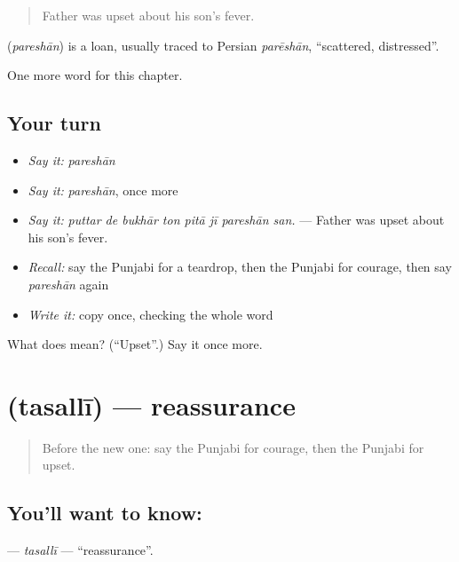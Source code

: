 \begin{quote}
Father was upset about his son's fever.
\end{quote}

\begin{cousinweb}
\textbf{} (\emph{pareshān}) is a loan, usually traced to Persian \emph{parēshān}, \textquotedblleft{}scattered, distressed\textquotedblright{}.
\end{cousinweb}

\begin{grammarlens}[title={What you've built}]
One more word for this chapter.
\end{grammarlens}

\subsection*{Your turn}
\begin{itemize}
\raggedright
  \item \emph{Say it:} \emph{pareshān}
  \item \emph{Say it:} \emph{pareshān}, once more
  \item \emph{Say it:} \emph{puttar de bukhār ton pitā jī pareshān san.} — Father was upset about his son's fever.
  \item \emph{Recall:} say the Punjabi for a teardrop, then the Punjabi for courage, then say \emph{pareshān} again
  \item \emph{Write it:} copy \textbf{} once, checking the whole word
\end{itemize}

\begin{tcolorbox}[breakable,colback=teal!4,colframe=teal!35!black,title={Before you move on}]
What does  mean? (\textquotedblleft{}Upset\textquotedblright{}.) Say it once more.
\end{tcolorbox}
\section[\texorpdfstring{\pa{ਤਸੱਲੀ} (tasallī)}{ਤਸੱਲੀ (tasallī)}]{ (tasallī) — reassurance}

\label{lesson:PA-C328-tasalli}



\begin{quote}
Before the new one: say the Punjabi for courage, then the Punjabi for upset.
\end{quote}

\subsection*{You'll want to know: }
\textbf{} — \emph{tasallī} — \textquotedblleft{}reassurance\textquotedblright{}.

